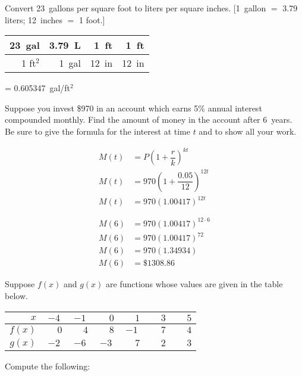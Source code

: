 \documentclass[12pt,letterpaper]{exam}
\begin{document}
\begin{questions}
\newpage
\question[6] Convert 23~gallons per square foot to liters per square inches. [1~gallon $=$ 3.79 liters; 12~inches $=$ 1 foot.] \pspace

	\begin{table}[!ht]
	\centering
	\begin{tabular}{r|r|r|r}
	23~gal  & 3.79~L & 1~ft    & 1~ft \\ \hline
	1 ft$^2$ & 1~gal  & 12~in & 12~in
	\end{tabular}
	= 0.605347~gal/ft$^2$
	\end{table}





\newpage
\question[6] Suppose you invest \$970 in an account which earns 5\% annual interest compounded monthly. Find the amount of money in the account after 6~years. Be sure to give the formula for the interest at time $t$ and to show all your work. \pspace

	\[
	\begin{aligned}
	M(t)&= P \left(1 + \dfrac{r}{k} \right)^{kt} \\[0.3cm]
	M(t)&= 970 \left(1 + \dfrac{0.05}{12} \right)^{12t} \\[0.3cm]
	M(t)&= 970 (1.00417)^{12t} \\[0.3cm]
	\\ \\
	M(6)&= 970 (1.00417)^{12 \cdot 6} \\[0.3cm]
	M(6)&= 970 (1.00417)^{72} \\[0.3cm]
	M(6)&= 970(1.34934) \\[0.3cm]
	M(6)&= \$1308.86
	\end{aligned}
	\]





\newpage
\question[10] Suppose $f(x)$ and $g(x)$ are functions whose values are given in the table below.
	\begin{table}[!ht]
	\centering
	\begin{tabular}{|r||c|c|c|c|c|c|} \hline
	$x$ & $-4$ & $-1$ & $\phantom{-}0$ & $\phantom{-}1$ & $\phantom{-}3$ & $\phantom{-}5$ \\ \hline
	$f(x)$ & $\phantom{-}0$ & $\phantom{-}4$ & $\phantom{-}8$ & $-1$ & $\phantom{-}7$ & $\phantom{-}4$ \\ \hline
	$g(x)$ & $-2$ & $-6$ & $-3$ & $\phantom{-}7$ & $\phantom{-}2$ & $\phantom{-}3$ \\ \hline
	\end{tabular}
	\end{table} \par
Compute the following: \pspace
        \begin{parts}

\end{parts}
\end{questions}
\end{document}
